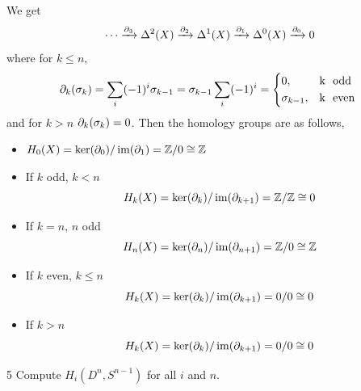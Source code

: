 \documentclass[12pt]{article}
\begin{document}
\begin{solution}
    \bbni
    
    We get 
    \[\cdots \xrightarrow{\partial_3} \Delta^2(X) \xrightarrow{\partial_2} \Delta^1(X) \xrightarrow{\partial_1} \Delta^0 (X) \xrightarrow{\partial_0} 0\]
    where for $k \leq n$,
    \[\d_k(\sigma_k) = \sum_i(-1)^i\sigma_{k-1} = \sigma_{k-1}\sum_i(-1)^i = \begin{cases*}
        0, & k \text{ odd} \\ 
        \sigma_{k-1}, & k \text{ even}
    \end{cases*}\]
    and for $k > n$ $\partial_k(\sigma_k) = 0$. 
    Then the homology groups are as follows, 
    \begin{itemize}
        \item $H_0(X) = \ker(\partial_0)/\operatorname{im}(\partial_1) = \mathbb Z/0 \cong \mathbb Z$
        \item If $k$ odd, $k < n$
        \[H_k(X) = \ker(\partial_k)/\operatorname{im}(\partial_{k+1}) = \mathbb Z/\mathbb Z \cong 0\]
        \item If $k = n$, $n$ odd
        \[H_n(X) = \ker(\partial_n)/\operatorname{im}(\partial_{n+1}) = \mathbb Z/0 \cong \mathbb Z\]
        \item If $k$ even, $k \leq n$
        \[H_k(X) = \ker(\partial_k)/\operatorname{im}(\partial_{k+1}) = 0/0 \cong 0\]
        \item If $k > n$
        \[H_k(X) = \ker(\partial_k)/\operatorname{im}(\partial_{k+1}) = 0/0 \cong 0\]
    \end{itemize}
\end{solution}

\newpage 

\begin{problem}{5}
    Compute $H_i(D^n, S^{n-1})$ for all $i$ and $n$. 
\end{problem}
\end{document}
